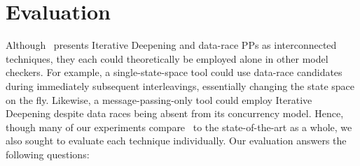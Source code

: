 
\section{Evaluation}


Although \quicksand~presents Iterative Deepening and data-race PPs as interconnected techniques, they each could theoretically be employed alone in other model checkers.
For example, a single-state-space tool could use data-race candidates during immediately subsequent interleavings, essentially changing the state space on the fly.
Likewise, a message-passing-only tool could employ Iterative Deepening despite data races being absent from its concurrency model.
Hence, though many of our experiments compare \quicksand~to the state-of-the-art as a whole,
we also sought to evaluate each technique individually.
Our evaluation answers the following questions:
